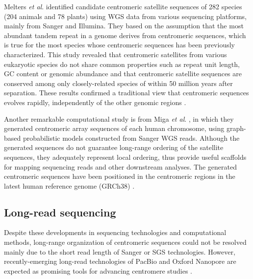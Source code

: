   Melters \textit{et al}. \cite{Melters2013} identified candidate centromeric satellite sequences of 282 species (204 animals and 78 plants) using WGS data from various sequencing platforms, mainly from Sanger and Illumina. They based on the assumption that the most abundant tandem repeat in a genome derives from centromeric sequences, which is true for the most species whose centromeric sequences has been previously characterized. This study revealed that centromeric satellites from various eukaryotic species do not share common properties such as repeat unit length, GC content or genomic abundance and that centromeric satellite sequences are conserved among only closely-related species of within 50 million years after separation. These results confirmed a traditional view that centromeric sequences evolves rapidly, independently of the other genomic regions \cite{Henikoff2001}.

  Another remarkable computational study is from Miga \textit{et al}. \cite{Miga2014}, in which they generated centromeric array sequences of each human chromosome, using graph-based probabilistic models constructed from Sanger WGS reads. Although the generated sequences do not guarantee long-range ordering of the satellite sequences, they adequately represent local ordering, thus provide useful scaffolds for mapping sequencing reads and other downstream analyses. The generated centromeric sequences have been positioned in the centromeric regions in the latest human reference genome (GRCh38) \cite{GenomeRef2013}.


\subsection*{Long-read sequencing}
  Despite these developments in sequencing technologies and computational methods, long-range organization of centromeric sequences could not be resolved mainly due to the short read length of Sanger or SGS technologies. However, recently-emerging long-read technologies of PacBio \cite{Eid2009} and Oxford Nanopore \cite{Jain2016} are expected as promising tools for advancing centromere studies \cite{Aldrup-MacDonald2014, Miga2015}.


